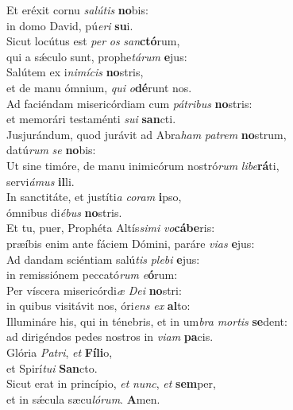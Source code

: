 \evenverse Et eréxit cornu \textit{sa}\textit{lú}\textit{tis} \textbf{no}bis:~\*\\
\evenverse in domo David, pú\textit{e}\textit{ri} \textbf{su}i.\\
\oddverse Sicut locútus est \textit{per} \textit{os} \textit{san}\textbf{ctó}rum,~\*\\
\oddverse qui a sǽculo sunt, prophe\textit{tá}\textit{rum} \textbf{e}jus:\\
\evenverse Salútem ex i\textit{ni}\textit{mí}\textit{cis} \textbf{no}stris,~\*\\
\evenverse et de manu ómnium, \textit{qui} \textit{o}\textbf{dé}runt nos.\\
\oddverse Ad faciéndam misericórdiam cum \textit{pá}\textit{tri}\textit{bus} \textbf{no}stris:~\*\\
\oddverse et memorári testaménti \textit{su}\textit{i} \textbf{san}cti.\\
\evenverse Jusjurándum, quod jurávit ad Abra\textit{ham} \textit{pa}\textit{trem} \textbf{no}strum,~\*\\
\evenverse datú\textit{rum} \textit{se} \textbf{no}bis:\\
\oddverse Ut sine timóre, de manu inimicórum nostró\textit{rum} \textit{li}\textit{be}\textbf{rá}ti,~\*\\
\oddverse servi\textit{á}\textit{mus} \textbf{il}li.\\
\evenverse In sanctitáte, et justíti\textit{a} \textit{co}\textit{ram} \textbf{i}pso,~\*\\
\evenverse ómnibus di\textit{é}\textit{bus} \textbf{no}stris.\\
\oddverse Et tu, puer, Prophéta Altís\textit{si}\textit{mi} \textit{vo}\textbf{cá}\textbf{be}ris:~\*\\
\oddverse præíbis enim ante fáciem Dómini, paráre \textit{vi}\textit{as} \textbf{e}jus:\\
\evenverse Ad dandam sciéntiam salú\textit{tis} \textit{ple}\textit{bi} \textbf{e}jus:~\*\\
\evenverse in remissiónem peccató\textit{rum} \textit{e}\textbf{ó}rum:\\
\oddverse Per víscera misericórdi\textit{æ} \textit{De}\textit{i} \textbf{no}stri:~\*\\
\oddverse in quibus visitávit nos, óri\textit{ens} \textit{ex} \textbf{al}to:\\
\evenverse Illumináre his, qui in ténebris, et in um\textit{bra} \textit{mor}\textit{tis} \textbf{se}dent:~\*\\
\evenverse ad dirigéndos pedes nostros in \textit{vi}\textit{am} \textbf{pa}cis.\\
\oddverse Glória \textit{Pa}\textit{tri}, \textit{et} \textbf{Fí}\textbf{li}o,~\*\\
\oddverse et Spirí\textit{tu}\textit{i} \textbf{San}cto.\\
\evenverse Sicut erat in princípio, \textit{et} \textit{nunc}, \textit{et} \textbf{sem}per,~\*\\
\evenverse et in sǽcula sæcu\textit{ló}\textit{rum}. \textbf{A}men.\\
